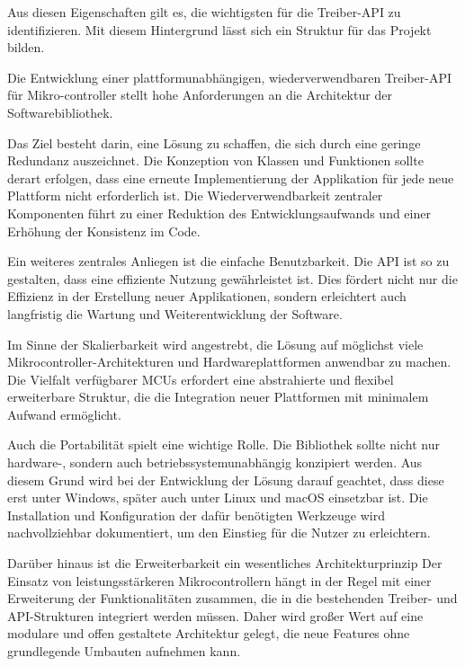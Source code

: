 Aus diesen Eigenschaften gilt es, die wichtigsten für die Treiber-API zu identifizieren. 
Mit diesem Hintergrund lässt sich ein Struktur für das Projekt bilden.

Die Entwicklung einer plattformunabhängigen, wiederverwendbaren Treiber-API für Mikro-controller stellt hohe Anforderungen an die Architektur der Softwarebibliothek.

Das Ziel besteht darin, eine Lösung zu schaffen, die sich durch eine geringe Redundanz auszeichnet. 
Die Konzeption von Klassen und Funktionen sollte derart erfolgen, dass eine erneute Implementierung der Applikation für jede neue Plattform nicht erforderlich ist.
Die Wiederverwendbarkeit zentraler Komponenten führt zu einer Reduktion des Entwicklungsaufwands und einer Erhöhung der Konsistenz im Code.

Ein weiteres zentrales Anliegen ist die einfache Benutzbarkeit. 
Die API ist so zu gestalten, dass eine effiziente Nutzung gewährleistet ist. 
Dies fördert nicht nur die Effizienz in der Erstellung neuer Applikationen, sondern erleichtert auch langfristig die Wartung und Weiterentwicklung der Software.

Im Sinne der Skalierbarkeit wird angestrebt, die Lösung auf möglichst viele Mikrocontroller-Architekturen und Hardwareplattformen anwendbar zu machen.
Die Vielfalt verfügbarer MCUs erfordert eine abstrahierte und flexibel erweiterbare Struktur, die die Integration neuer Plattformen mit minimalem Aufwand ermöglicht.

Auch die Portabilität spielt eine wichtige Rolle.
Die Bibliothek sollte nicht nur hardware-, sondern auch betriebssystemunabhängig konzipiert werden.
Aus diesem Grund wird bei der Entwicklung der Lösung darauf geachtet, dass diese erst unter Windows, später auch unter Linux und macOS einsetzbar ist.
Die Installation und Konfiguration der dafür benötigten Werkzeuge wird nachvollziehbar dokumentiert, um den Einstieg für die Nutzer zu erleichtern.

Darüber hinaus ist die Erweiterbarkeit ein wesentliches Architekturprinzip
Der Einsatz von leistungsstärkeren Mikrocontrollern hängt in der Regel mit einer Erweiterung der Funktionalitäten zusammen, die in die bestehenden Treiber- und API-Strukturen integriert werden müssen.
Daher wird großer Wert auf eine modulare und offen gestaltete Architektur gelegt, die neue Features ohne grundlegende Umbauten aufnehmen kann.

